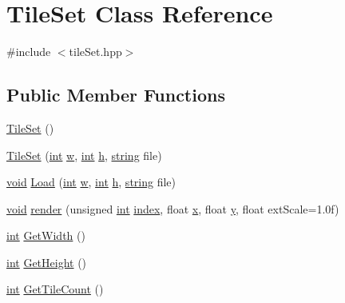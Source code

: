 \hypertarget{class_tile_set}{\section{Tile\-Set Class Reference}
\label{class_tile_set}
}


{\ttfamily \#include $<$tile\-Set.\-hpp$>$}

\subsection*{Public Member Functions}
\begin{DoxyCompactItemize}
\item 
\hyperlink{class_tile_set_a10830bfd0dd294b432520391251600ce}{Tile\-Set} ()
\item 
\hyperlink{class_tile_set_af50e6ba8a87fc066d9fbf8a4c78a5a9e}{Tile\-Set} (\hyperlink{_s_d_l__thread_8h_a6a64f9be4433e4de6e2f2f548cf3c08e}{int} \hyperlink{_s_d_l__opengl__glext_8h_a6ee8f168a7ab6785a9bb57c6715dad99}{w}, \hyperlink{_s_d_l__thread_8h_a6a64f9be4433e4de6e2f2f548cf3c08e}{int} \hyperlink{_s_d_l__opengl__glext_8h_afa0fb1b5e976920c0abeff2dca3ed774}{h}, \hyperlink{_s_d_l__opengl__glext_8h_ae84541b4f3d8e1ea24ec0f466a8c568b}{string} file)
\item 
\hyperlink{_s_d_l__opengles2__gl2ext_8h_ae5d8fa23ad07c48bb609509eae494c95}{void} \hyperlink{class_tile_set_a5fcf2b00089d0cf7a9a7a9c42b7597b0}{Load} (\hyperlink{_s_d_l__thread_8h_a6a64f9be4433e4de6e2f2f548cf3c08e}{int} \hyperlink{_s_d_l__opengl__glext_8h_a6ee8f168a7ab6785a9bb57c6715dad99}{w}, \hyperlink{_s_d_l__thread_8h_a6a64f9be4433e4de6e2f2f548cf3c08e}{int} \hyperlink{_s_d_l__opengl__glext_8h_afa0fb1b5e976920c0abeff2dca3ed774}{h}, \hyperlink{_s_d_l__opengl__glext_8h_ae84541b4f3d8e1ea24ec0f466a8c568b}{string} file)
\item 
\hyperlink{_s_d_l__opengles2__gl2ext_8h_ae5d8fa23ad07c48bb609509eae494c95}{void} \hyperlink{class_tile_set_a5f68daa3918624795358fd01c39bd669}{render} (unsigned \hyperlink{_s_d_l__thread_8h_a6a64f9be4433e4de6e2f2f548cf3c08e}{int} \hyperlink{_s_d_l__opengl__glext_8h_a57f14e05b1900f16a2da82ade47d0c6d}{index}, float \hyperlink{_s_d_l__opengl_8h_ad0e63d0edcdbd3d79554076bf309fd47}{x}, float \hyperlink{_s_d_l__opengl_8h_a1675d9d7bb68e1657ff028643b4037e3}{y}, float ext\-Scale=1.\-0f)
\item 
\hyperlink{_s_d_l__thread_8h_a6a64f9be4433e4de6e2f2f548cf3c08e}{int} \hyperlink{class_tile_set_ac59bfe1ccab2e53eec2c46448a4d4876}{Get\-Width} ()
\item 
\hyperlink{_s_d_l__thread_8h_a6a64f9be4433e4de6e2f2f548cf3c08e}{int} \hyperlink{class_tile_set_acf386c42d0882b653544ad9ff34d88db}{Get\-Height} ()
\item 
\hyperlink{_s_d_l__thread_8h_a6a64f9be4433e4de6e2f2f548cf3c08e}{int} \hyperlink{class_tile_set_add793423cd73315081d65c670a2fa571}{Get\-Tile\-Count} ()
\end{DoxyCompactItemize}


